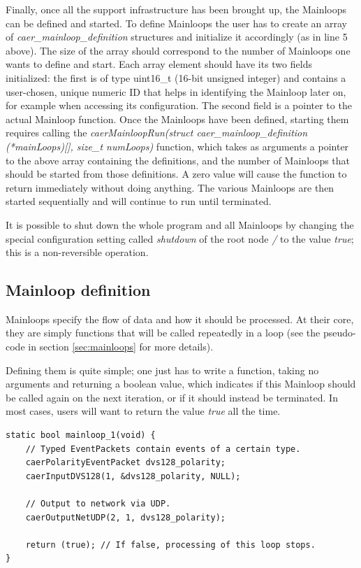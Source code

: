 \documentclass[a4paper,12pt]{report}
\begin{document}
Finally, once all the support infrastructure has been brought up, the Mainloops can be defined and started. To define Mainloops the user has to create an array of \emph{caer\_mainloop\_definition} structures and initialize it accordingly (as in line 5 above).
The size of the array should correspond to the number of Mainloops one wants to define and start. Each array element should have its two fields initialized: the first is of type uint16\_t (16-bit unsigned integer) and contains a user-chosen, unique numeric ID that helps in identifying the Mainloop later on, for example when accessing its configuration. The second field is a pointer to the actual Mainloop function.
Once the Mainloops have been defined, starting them requires calling the \emph{caerMainloopRun(struct caer\_mainloop\_definition (*mainLoops)[], size\_t numLoops)} function, which takes as arguments a pointer to the above array containing the definitions, and the number of Mainloops that should be started from those definitions. A zero value will cause the function to return immediately without doing anything.
The various Mainloops are then started sequentially and will continue to run until terminated.

It is possible to shut down the whole program and all Mainloops by changing the special configuration setting called \emph{shutdown} of the root node \emph{/} to the value \emph{true}; this is a non-reversible operation.

\subsection{Mainloop definition} \label{subsec:mainloop_definition}

Mainloops specify the flow of data and how it should be processed.
At their core, they are simply functions that will be called repeatedly in a loop (see the pseudo-code in section \ref{sec:mainloops} for more details).

Defining them is quite simple; one just has to write a function, taking no arguments and returning a boolean value, which indicates if this Mainloop should be called again on the next iteration, or if it should instead be terminated. In most cases, users will want to return the value \emph{true} all the time.

\begin{lstlisting}
static bool mainloop_1(void) {
    // Typed EventPackets contain events of a certain type.
    caerPolarityEventPacket dvs128_polarity;
    caerInputDVS128(1, &dvs128_polarity, NULL);

    // Output to network via UDP.
    caerOutputNetUDP(2, 1, dvs128_polarity);

    return (true); // If false, processing of this loop stops.
}
\end{lstlisting}
\end{document}
